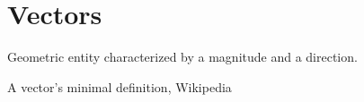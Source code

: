 


\section{Vectors}
\epigraph{Geometric entity characterized by a magnitude and a direction.}{A vector's minimal definition, Wikipedia}
\begin{figure}
    
\end{figure}
